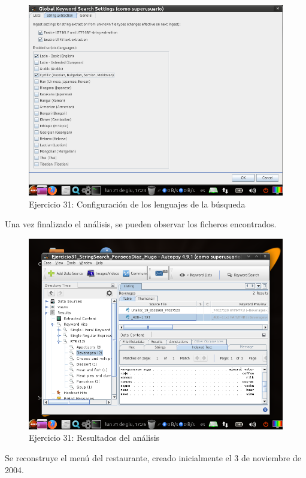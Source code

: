 \documentclass[11pt]{article}
\begin{document}
\begin{figure}[H]
    \caption{Ejercicio 31: Configuración de los lenguajes de la búsqueda}
  \centering
  \includegraphics[scale=0.7]{p02/e31-5.png}
\end{figure}

Una vez finalizado el análisis, se pueden observar los ficheros encontrados.

\begin{figure}[H]
    \caption{Ejercicio 31: Resultados del análisis}
  \centering
  \includegraphics[scale=0.7]{p02/e31-6.png}
\end{figure}

Se reconstruye el menú del restaurante, creado inicialmente el 3 de noviembre de 2004.
\end{document}
